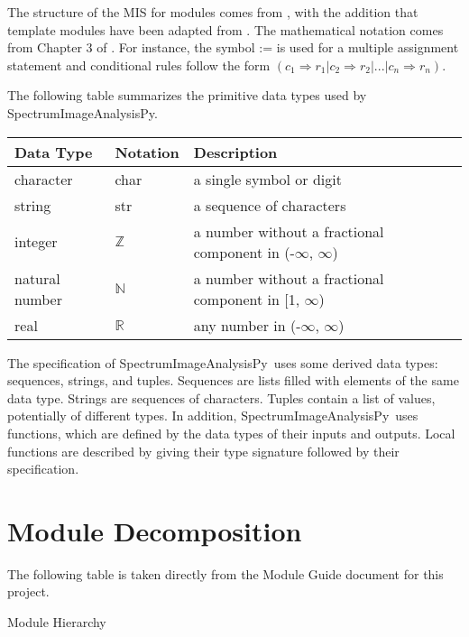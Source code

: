 \documentclass[12pt, titlepage]{article}
\newcommand{\progname}{SpectrumImageAnalysisPy}
\begin{document}

The structure of the MIS for modules comes from \cite{HoffmanAndStrooper1995},
with the addition that template modules have been adapted from
\cite{GhezziEtAl2003}.  The mathematical notation comes from Chapter 3 of
\cite{HoffmanAndStrooper1995}.  For instance, the symbol := is used for a
multiple assignment statement and conditional rules follow the form $(c_1
\Rightarrow r_1 | c_2 \Rightarrow r_2 | ... | c_n \Rightarrow r_n )$.

The following table summarizes the primitive data types used by \progname. 

\begin{center}
\renewcommand{\arraystretch}{1.2}
\noindent 
\begin{tabular}{l l p{7.5cm}} 
\toprule 
\textbf{Data Type} & \textbf{Notation} & \textbf{Description}\\ 
\midrule
character & char & a single symbol or digit\\
string & str & a sequence of characters\\
integer & $\mathbb{Z}$ & a number without a fractional component in (-$\infty$, $\infty$) \\
natural number & $\mathbb{N}$ & a number without a fractional component in [1, $\infty$) \\
real & $\mathbb{R}$ & any number in (-$\infty$, $\infty$)\\
\bottomrule
\end{tabular} 
\end{center}

\noindent
The specification of \progname \ uses some derived data types: sequences, strings, and
tuples. Sequences are lists filled with elements of the same data type. Strings
are sequences of characters. Tuples contain a list of values, potentially of
different types. In addition, \progname \ uses functions, which
are defined by the data types of their inputs and outputs. Local functions are
described by giving their type signature followed by their specification.

\section{Module Decomposition}

The following table is taken directly from the Module Guide document for this project.

\begin{table}[h!]
\centering

\caption{Module Hierarchy}
\label{TblMH}
\end{table}
\end{document}
